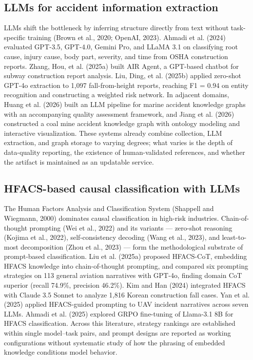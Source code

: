 \documentclass[11pt]{article}
\begin{document}
\subsection{LLMs for accident information extraction}
LLMs shift the bottleneck by inferring structure directly from text without task-specific training (Brown et al., 2020; OpenAI, 2023). Ahmadi et al. (2024) evaluated GPT-3.5, GPT-4.0, Gemini Pro, and LLaMA 3.1 on classifying root cause, injury cause, body part, severity, and time from OSHA construction reports. Zhang, Hou, et al. (2025a) built AIR Agent, a GPT-based chatbot for subway construction report analysis. Liu, Ding, et al. (2025b) applied zero-shot GPT-4o extraction to 1,097 fall-from-height reports, reaching F1 = 0.94 on entity recognition and constructing a weighted risk network. In adjacent domains, Huang et al. (2026) built an LLM pipeline for marine accident knowledge graphs with an accompanying quality assessment framework, and Jiang et al. (2026) constructed a coal mine accident knowledge graph with ontology modeling and interactive visualization. These systems already combine collection, LLM extraction, and graph storage to varying degrees; what varies is the depth of data-quality reporting, the existence of human-validated references, and whether the artifact is maintained as an updatable service.

\subsection{HFACS-based causal classification with LLMs}
The Human Factors Analysis and Classification System (Shappell and Wiegmann, 2000) dominates causal classification in high-risk industries. Chain-of-thought prompting (Wei et al., 2022) and its variants --- zero-shot reasoning (Kojima et al., 2022), self-consistency decoding (Wang et al., 2023), and least-to-most decomposition (Zhou et al., 2023) --- form the methodological substrate of prompt-based classification. Liu et al. (2025a) proposed HFACS-CoT, embedding HFACS knowledge into chain-of-thought prompting, and compared six prompting strategies on 113 general aviation narratives with GPT-4o, finding domain CoT superior (recall 74.9\%, precision 46.2\%). Kim and Han (2024) integrated HFACS with Claude 3.5 Sonnet to analyze 1,816 Korean construction fall cases. Yan et al. (2025) applied HFACS-guided prompting to UAV incident narratives across seven LLMs. Ahmadi et al. (2025) explored GRPO fine-tuning of Llama-3.1 8B for HFACS classification. Across this literature, strategy rankings are established within single model--task pairs, and prompt designs are reported as working configurations without systematic study of how the phrasing of embedded knowledge conditions model behavior.
\end{document}

